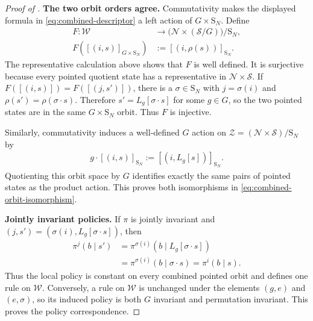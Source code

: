 \documentclass{article}
\theoremstyle{plain}
\theoremstyle{definition}
\theoremstyle{remark}
\newcommand{\N}{\mathcal{N}}
\newcommand{\St}{\mathcal{S}}
\newcommand{\orbit}[1]{[#1]}
\newcommand{\Sym}{\mathrm{S}}
\begin{document}
\begin{proof}[Proof of ]
\medskip\noindent\textbf{The two orbit orders agree.}
Commutativity makes the displayed formula in
\eqref{eq:combined-descriptor} a left action of
$G\times\Sym_N$. Define
\begin{align*}
  F:
  \mathcal W
  &\longrightarrow
  \big(\N\times(\St/G)\big)/\Sym_N,\\
  F\!\left(\orbit{(i,s)}_{G\times\Sym_N}\right)
  &:=
  \orbit{(i,\rho(s))}_{\Sym_N}.
\end{align*}
The representative calculation above shows that $F$ is well defined. It is
surjective because every pointed quotient state has a representative in
$\N\times\St$. If
$F(\orbit{(i,s)})=F(\orbit{(j,s')})$, there is a $\sigma\in\Sym_N$ with
$j=\sigma(i)$ and
$\rho(s')=\rho(\sigma\mathbin{\cdot}s)$. Therefore
$s'=L_g[\sigma\mathbin{\cdot}s]$ for some $g\in G$, so the two pointed states
are in the same $G\times\Sym_N$ orbit. Thus $F$ is injective.

Similarly, commutativity induces a well-defined $G$ action on
$\mathcal Z=(\N\times\St)/\Sym_N$ by
\begin{align*}
  g\mathbin{\cdot}\orbit{(i,s)}_{\Sym_N}
  :=
  \orbit{(i,L_g[s])}_{\Sym_N}.
\end{align*}
Quotienting this orbit space by $G$ identifies exactly the same pairs of
pointed states as the product action. This proves both isomorphisms in
\eqref{eq:combined-orbit-isomorphism}.

\medskip\noindent\textbf{Jointly invariant policies.}
If $\pi$ is jointly invariant and
$(j,s')=(\sigma(i),L_g[\sigma\mathbin{\cdot}s])$, then
\begin{align*}
  \pi^j(b\mid s')
  &=
  \pi^{\sigma(i)}
  (b\mid L_g[\sigma\mathbin{\cdot}s])\\
  &=
  \pi^{\sigma(i)}(b\mid\sigma\mathbin{\cdot}s)
  =
  \pi^i(b\mid s).
\end{align*}
Thus the local policy is constant on every combined pointed orbit and defines
one rule on $\mathcal W$. Conversely, a rule on $\mathcal W$ is unchanged
under the elements $(g,e)$ and $(e,\sigma)$, so its induced policy is both
$G$ invariant and permutation invariant. This proves the policy
correspondence.


\end{proof}
\end{document}
